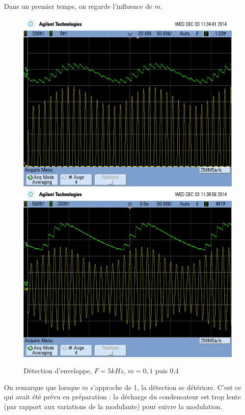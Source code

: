 \documentclass[../../Cours_M1.tex]{subfiles}
\begin{document}
Dans un premier temps, on regarde l'influence de $m$.
\begin{figure}[h!]
\centering
\includegraphics[scale=0.2]{DEOK.png}
\includegraphics[scale=0.2]{DEKO.png}
\caption{Détection d'enveloppe, $F=5kHz$, $m=0,1$ puis 0,4}
\end{figure}

On remarque que lorsque $m$ s'approche de 1, la détection se détériore. C'est ce qui avait été prévu en préparation : la décharge du condensateur est trop lente (par rapport aux variations de la modulante) pour suivre la modulation.
\end{document}
